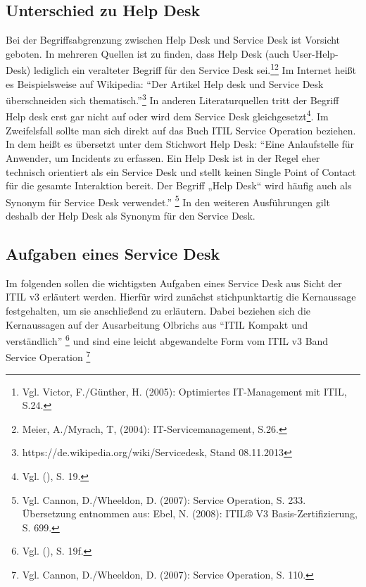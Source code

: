 \subsection{Unterschied zu Help Desk}

\noindent
Bei der Begriffsabgrenzung zwischen Help Desk und Service Desk ist Vorsicht geboten. In mehreren Quellen ist zu finden, dass Help Desk (auch User-Help-Desk) lediglich ein veralteter Begriff für den Service Desk sei.\footnote{Vgl. Victor, F./Günther, H. (2005): Optimiertes
IT-Management mit ITIL, S.24.}\footnote{Meier, A./Myrach, T, (2004): IT-Servicemanagement, S.26.} Im Internet heißt es Beispielsweise auf Wikipedia: \enquote{Der Artikel Help desk und Service Desk überschneiden sich thematisch.}\footnote{https://de.wikipedia.org/wiki/Servicedesk, Stand 08.11.2013} In anderen Literaturquellen tritt der Begriff Help desk erst gar nicht auf oder wird dem Service Desk gleichgesetzt\footnote{Vgl. \citeauthor{Olbrich} (\citeyear{Olbrich}), S. 19.}. Im Zweifelsfall sollte man sich direkt auf das Buch ITIL Service Operation beziehen. In dem heißt es übersetzt unter dem Stichwort Help Desk:
\enquote{Eine Anlaufstelle für Anwender, um Incidents zu erfassen. Ein Help Desk ist in der
Regel eher technisch orientiert als ein Service Desk und stellt keinen Single Point
of Contact für die gesamte Interaktion bereit. Der Begriff „Help Desk“ wird häufig
auch als Synonym für Service Desk verwendet.} \footnote{Vgl. Cannon, D./Wheeldon, D. (2007): Service Operation, S. 233. Übersetzung entnommen aus: Ebel, N. (2008): ITIL® V3 Basis-Zertifizierung, S. 699.} \newline
In den weiteren Ausführungen gilt deshalb der Help Desk als Synonym für den Service Desk.

\newpage


\subsection{Aufgaben eines Service Desk}

\noindent
Im folgenden sollen die wichtigsten Aufgaben eines Service Desk aus Sicht der ITIL v3 erläutert werden. Hierfür wird zunächst stichpunktartig die Kernaussage festgehalten, um sie anschließend zu erläutern. Dabei beziehen sich die Kernaussagen auf der Ausarbeitung Olbrichs aus \enquote{ITIL Kompakt und verständlich}
\footnote{Vgl. \citeauthor{Olbrich} (\citeyear{Olbrich}), S. 19f.}
und sind eine leicht abgewandelte Form vom ITIL v3 Band Service Operation \footnote{Vgl. Cannon, D./Wheeldon, D. (2007): Service Operation, S. 110.}

